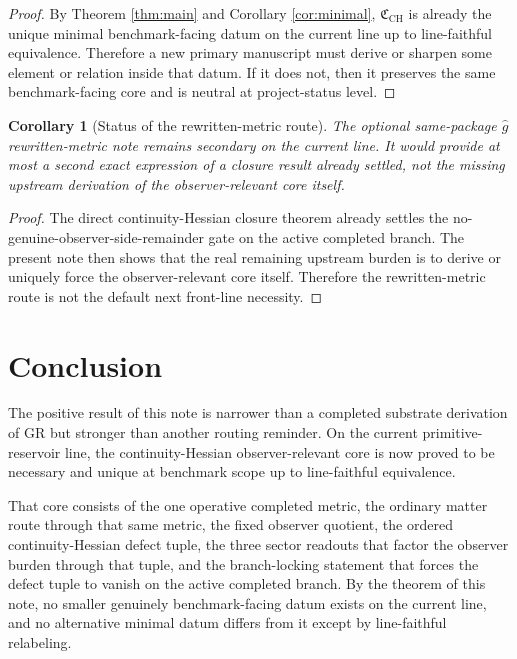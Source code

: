 \documentclass[11pt]{article}
\newcommand{\CoreData}{\mathfrak C_{\mathrm{CH}}}
\newtheorem{corollary}{Corollary}
\begin{document}
\begin{proof}
By Theorem \ref{thm:main} and Corollary \ref{cor:minimal}, \(\CoreData\) is already the unique minimal benchmark-facing datum on the current line up to line-faithful equivalence. Therefore a new primary manuscript must derive or sharpen some element or relation inside that datum. If it does not, then it preserves the same benchmark-facing core and is neutral at project-status level.
\end{proof}

\begin{corollary}[Status of the rewritten-metric route]
The optional same-package \(\widehat g\) rewritten-metric note remains secondary on the current line. It would provide at most a second exact expression of a closure result already settled, not the missing upstream derivation of the observer-relevant core itself.
\end{corollary}

\begin{proof}
The direct continuity-Hessian closure theorem already settles the no-genuine-observer-side-remainder gate on the active completed branch. The present note then shows that the real remaining upstream burden is to derive or uniquely force the observer-relevant core itself. Therefore the rewritten-metric route is not the default next front-line necessity.
\end{proof}

\section{Conclusion}

The positive result of this note is narrower than a completed substrate derivation of GR but stronger than another routing reminder. On the current primitive-reservoir line, the continuity-Hessian observer-relevant core is now proved to be necessary and unique at benchmark scope up to line-faithful equivalence.

That core consists of the one operative completed metric, the ordinary matter route through that same metric, the fixed observer quotient, the ordered continuity-Hessian defect tuple, the three sector readouts that factor the observer burden through that tuple, and the branch-locking statement that forces the defect tuple to vanish on the active completed branch. By the theorem of this note, no smaller genuinely benchmark-facing datum exists on the current line, and no alternative minimal datum differs from it except by line-faithful relabeling.
\end{document}
